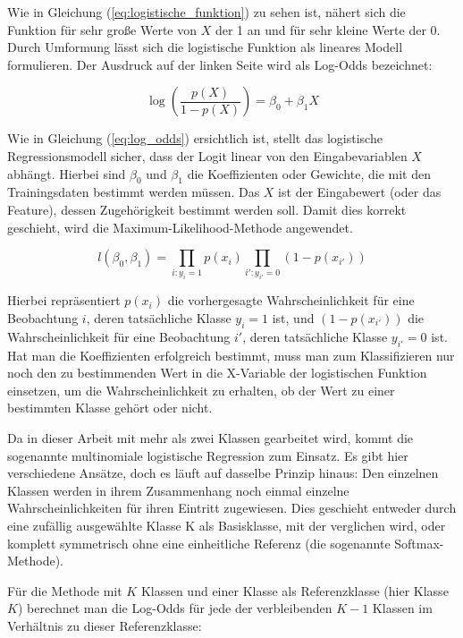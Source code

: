 Wie in Gleichung (\ref{eq:logistische_funktion}) zu sehen ist, nähert sich die Funktion für sehr große Werte von $X$ der 1 an und für sehr kleine Werte der 0. Durch Umformung lässt sich die logistische Funktion als lineares Modell formulieren. Der Ausdruck auf der linken Seite wird als Log-Odds bezeichnet:

\begin{equation}
    \log\left(\frac{p(X)}{1 - p(X)}\right) = \beta_0 + \beta_1 X
    \label{eq:log_odds}
\end{equation}

Wie in Gleichung (\ref{eq:log_odds}) ersichtlich ist, stellt das logistische Regressionsmodell sicher, dass der Logit linear von den Eingabevariablen $X$ abhängt.
Hierbei sind $\beta_0$ und $\beta_1$ die Koeffizienten oder Gewichte, die mit den Trainingsdaten bestimmt werden müssen. Das $X$ ist der Eingabewert (oder das Feature), dessen Zugehörigkeit bestimmt werden soll. Damit dies korrekt geschieht, wird die Maximum-Likelihood-Methode angewendet.

\begin{equation}
    l(\beta_0, \beta_1) = \prod_{i: y_i=1} p(x_i) \prod_{i': y_{i'}=0} (1 - p(x_{i'}))
    \label{eq:likelihood}
\end{equation}

Hierbei repräsentiert $p(x_i)$ die vorhergesagte Wahrscheinlichkeit für eine Beobachtung $i$, deren tatsächliche Klasse $y_i = 1$ ist, und $(1 - p(x_{i'}))$ die Wahrscheinlichkeit für eine Beobachtung $i'$, deren tatsächliche Klasse $y_{i'} = 0$ ist. Hat man die Koeffizienten erfolgreich bestimmt, muss man zum Klassifizieren nur noch den zu bestimmenden Wert in die X-Variable der logistischen Funktion einsetzen, um die Wahrscheinlichkeit zu erhalten, ob der Wert zu einer bestimmten Klasse gehört oder nicht.

Da in dieser Arbeit mit mehr als zwei Klassen gearbeitet wird, kommt die sogenannte multinomiale logistische Regression zum Einsatz. Es gibt hier verschiedene Ansätze, doch es läuft auf dasselbe Prinzip hinaus: Den einzelnen Klassen werden in ihrem Zusammenhang noch einmal einzelne Wahrscheinlichkeiten für ihren Eintritt zugewiesen. Dies geschieht entweder durch eine zufällig ausgewählte Klasse K als Basisklasse, mit der verglichen wird, oder komplett symmetrisch ohne eine einheitliche Referenz (die sogenannte Softmax-Methode).

Für die Methode mit $K$ Klassen und einer Klasse als Referenzklasse (hier Klasse $K$) berechnet man die Log-Odds für jede der verbleibenden $K-1$ Klassen im Verhältnis zu dieser Referenzklasse:

